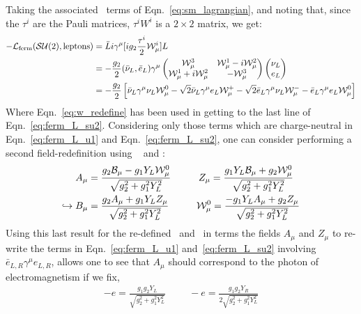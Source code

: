 Taking the associated \SUtwo~terms of Eqn.~\ref{eq:sm_lagrangian}, and noting
that, since the $\tau^i$ are the Pauli matrices, $\tau^i W^i$ is a $2\times2$ matrix, we get:
\begin{align}
	-\mathcal{L}_{\text{ferm}}(\mathcal{SU}(2), \text{leptons}) &= \bar{L} i \gamma^{\mu} [i g_2 \frac{\tau^i}{2} \mathcal{W}_{\mu}^i ] L \notag \\
	&= -\frac{g_2}{2} (\bar{\nu}_L, \bar{e}_L) \gamma^{\mu} \left( \begin{matrix} \mathcal{W}_{\mu}^3 & \mathcal{W}_{\mu}^1 - i\mathcal{W}_{\mu}^2 \\ \mathcal{W}_{\mu}^1 + i \mathcal{W}_{\mu}^2  & - \mathcal{W}_{\mu}^3\end{matrix} \right) \left( \begin{matrix} \nu_L \\ e_L \end{matrix} \right) \notag \\
	&= -\frac{g_2}{2} \left[ \bar{\nu}_L \gamma^{\mu} \nu_L \mathcal{W}_{\mu}^0 - \sqrt{2}  \bar{\nu}_L \gamma^{\mu} e_L \mathcal{W}_{\mu}^+ - \sqrt{2} \bar{e}_L \gamma^{\mu} \nu_L \mathcal{W}_{\mu}^- - \bar{e}_L \gamma^{\mu} e_L \mathcal{W}_{\mu}^0 \right]
    \label{eq:ferm_L_su2}
\end{align}
Where Eqn.~\ref{eq:w_redefine} has been used in getting to the last line of Eqn.~\ref{eq:ferm_L_su2}.
Considering only those terms which are charge-neutral in Eqn.~\ref{eq:ferm_L_u1} and Eqn.~\ref{eq:ferm_L_su2}, one can consider performing a second field-redefinition using
\fieldB~ and \fieldWzero:
\begin{align}
	A_{\mu} &= \frac{g_2 \mathcal{B}_{\mu} - g_1 Y_L \mathcal{W}_{\mu}^0}{\sqrt{g_2^2 + g_1^2 Y_L^2}} \hspace{1cm} Z_{\mu} = \frac{g_1 Y_L \mathcal{B}_{\mu} + g_2 \mathcal{W}_{\mu}^0}{\sqrt{g_2^2 + g_1^2 Y_L^2}} \notag \\
	\hookrightarrow B_{\mu} &= \frac{g_2 A_{\mu} + g_1 Y_L Z_{\mu}}{\sqrt{g_2^2 + g_1^2 Y_L^2}} \hspace{1cm} \mathcal{W}_{\mu}^0 = \frac{-g_1 Y_L A_{\mu} + g_2 Z_{\mu}}{\sqrt{g_2^2 + g_1^2 Y_L^2}}
\end{align}
Using this last result for the re-defined \fieldB~and \fieldWzero~in terms the
fields $A_{\mu}$ and $Z_{\mu}$ to re-write the terms in Eqn.~\ref{eq:ferm_L_u1} and~\ref{eq:ferm_L_su2} involving $\bar{e}_{L,R} \gamma^{\mu} e_{L,R}$, allows
one to see that $A_{\mu}$ should correspond to the photon of electromagnetism if we fix,
\begin{align}
	-e = \frac{g_1 g_2 Y_L} {\sqrt{g_2^2 + g_1^2 Y_L^2}} \hspace{1cm} -e = \frac{g_1 g_2 Y_R}{2 \sqrt{g_2^2 + g_1^2 Y_L^2}} \nonumber
\end{align}

